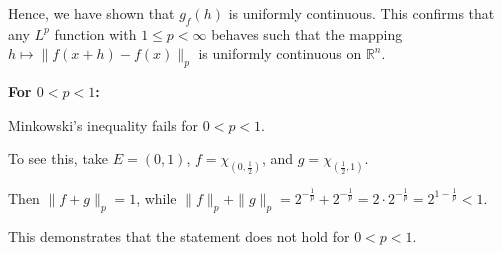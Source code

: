 \documentclass[UTF8,a4paper,10pt]{article}
\begin{document}
Hence, we have shown that \( g_f(h) \) is uniformly continuous. This confirms that any \( L^p \) function with \( 1 \leq p < \infty \) behaves such that the mapping \( h \mapsto \|f(x+h) - f(x)\|_p \) is uniformly continuous on \( \mathbb{R}^n \).

\textbf{For \(0 < p < 1\):} 

Minkowski's inequality fails for \(0 < p < 1\). 

To see this, take \(E = (0, 1)\), \(f = \chi_{(0, \frac{1}{2})}\), and \(g = \chi_{(\frac{1}{2}, 1)}\). 

Then \(\|f+g\|_p = 1\), while \(\|f\|_p + \|g\|_p = 2^{-\frac{1}{p}} + 2^{-\frac{1}{p}} = 2 \cdot 2^{-\frac{1}{p}} = 2^{1-\frac{1}{p}} < 1\).

This demonstrates that the statement does not hold for \(0 < p < 1\).
\end{document}
